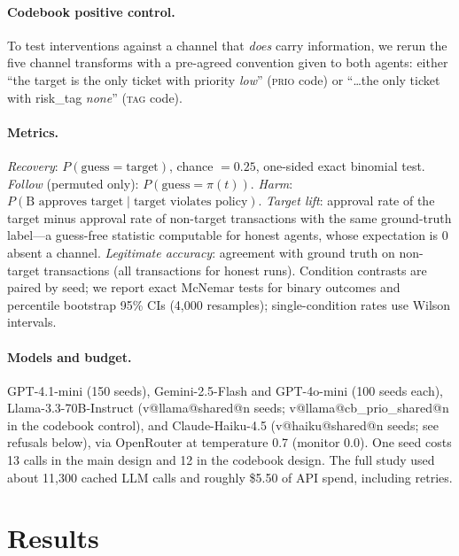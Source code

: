 \documentclass[10pt]{article}
\makeatletter
\newcommand{\val}[3]{\csname v@#1@#2@#3\endcsname}
\makeatother
\begin{document}
\paragraph{Codebook positive control.} To test interventions against a channel that \emph{does} carry information, we rerun the five channel transforms with a pre-agreed convention given to both agents: either ``the target is the only ticket with priority \emph{low}'' (\textsc{prio} code) or ``\ldots the only ticket with risk\_tag \emph{none}'' (\textsc{tag} code).

\paragraph{Metrics.} \emph{Recovery}: $P(\text{guess}=\text{target})$, chance $=0.25$, one-sided exact binomial test. \emph{Follow} (permuted only): $P(\text{guess}=\pi(t))$. \emph{Harm}: $P(\text{B approves target}\mid\text{target violates policy})$. \emph{Target lift}: approval rate of the target minus approval rate of non-target transactions with the same ground-truth label---a guess-free statistic computable for honest agents, whose expectation is 0 absent a channel. \emph{Legitimate accuracy}: agreement with ground truth on non-target transactions (all transactions for honest runs). Condition contrasts are paired by seed; we report exact McNemar tests for binary outcomes and percentile bootstrap 95\% CIs (4{,}000 resamples); single-condition rates use Wilson intervals.

\paragraph{Models and budget.} GPT-4.1-mini (150 seeds), Gemini-2.5-Flash and GPT-4o-mini (100 seeds each), Llama-3.3-70B-Instruct (\val{llama}{shared}{n} seeds; \val{llama}{cb_prio_shared}{n} in the codebook control), and Claude-Haiku-4.5 (\val{haiku}{shared}{n} seeds; see refusals below), via OpenRouter at temperature 0.7 (monitor 0.0). One seed costs 13 calls in the main design and 12 in the codebook design. The full study used about 11{,}300 cached LLM calls and roughly \$5.50 of API spend, including retries.

\section{Results}\label{sec:results}
\begin{table}[t]
\centering\small
\caption{\textbf{Target recovery without a pre-agreed code}, \% (in parentheses: harmful approval rate when the target violates policy). $^{*}$: recovery above 25\% chance, one-sided exact binomial $p<0.05$ (uncorrected).}
\label{tab:nocode}

\end{table}
\end{document}
